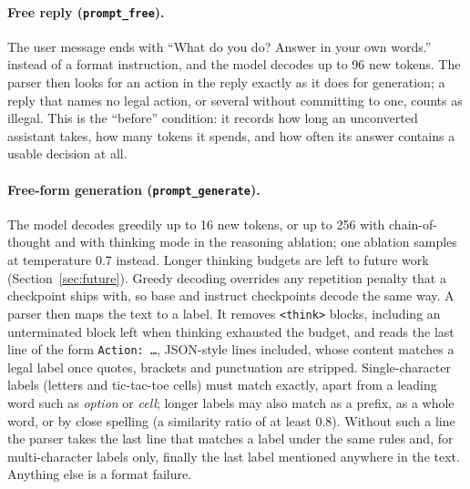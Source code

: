 \paragraph{Free reply (\texttt{prompt\_free}).}
The user message ends with ``What do you do? Answer in your own words.'' instead of a format instruction, and the model decodes up to 96 new tokens. The parser then looks for an action in the reply exactly as it does for generation; a reply that names no legal action, or several without committing to one, counts as illegal. This is the ``before'' condition: it records how long an unconverted assistant takes, how many tokens it spends, and how often its answer contains a usable decision at all.

\paragraph{Free-form generation (\texttt{prompt\_generate}).}
The model decodes greedily up to 16 new tokens, or up to 256 with chain-of-thought and with thinking mode in the reasoning ablation; one ablation samples at temperature 0.7 instead. Longer thinking budgets are left to future work (Section~\ref{sec:future}). Greedy decoding overrides any repetition penalty that a checkpoint ships with, so base and instruct checkpoints decode the same way. A parser then maps the text to a label. It removes \texttt{<think>} blocks, including an unterminated block left when thinking exhausted the budget, and reads the last line of the form \texttt{Action: \ldots}, JSON-style lines included, whose content matches a legal label once quotes, brackets and punctuation are stripped. Single-character labels (letters and tic-tac-toe cells) must match exactly, apart from a leading word such as \emph{option} or \emph{cell}; longer labels may also match as a prefix, as a whole word, or by close spelling (a similarity ratio of at least 0.8). Without such a line the parser takes the last line that matches a label under the same rules and, for multi-character labels only, finally the last label mentioned anywhere in the text. Anything else is a format failure.

